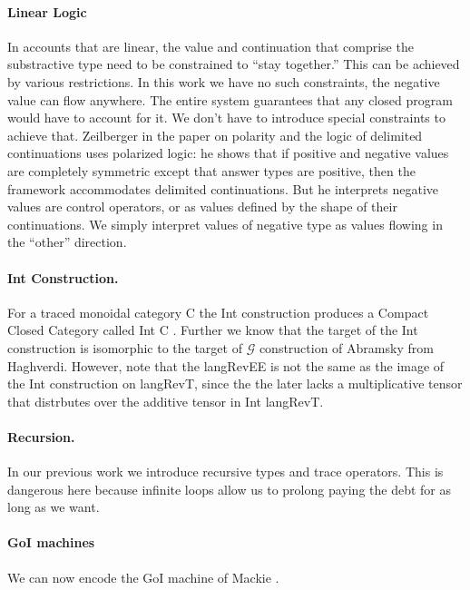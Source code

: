 \documentclass[preprint]{sigplanconf}
\newcommand{\G}{\ensuremath{\mathcal{G}}\xspace}
\begin{document}
\paragraph*{Linear Logic} In accounts that are linear, the value and
continuation that comprise the substractive type need to be constrained to
``stay together.'' This can be achieved by various restrictions. In this work
we have no such constraints, the negative value can flow anywhere. The entire
system guarantees that any closed program would have to account for it. We
don't have to introduce special constraints to achieve that. Zeilberger in
the paper on polarity and the logic of delimited continuations uses polarized
logic: he shows that if positive and negative values are completely symmetric
except that answer types are positive, then the framework accommodates
delimited continuations. But he interprets negative values are control
operators, or as values defined by the shape of their continuations. We
simply interpret values of negative type as values flowing in the ``other''
direction.

\paragraph*{Int Construction.}
For a traced monoidal category {{C}} the Int construction produces a
Compact Closed Category called Int {{C}} \cite{joyal1996traced}.
Further we know that the target of the Int construction is isomorphic
to the target of \G construction of Abramsky \cite{Abramsky96:0} from
Haghverdi. However, note that the {{langRevEE}} is not the same as the
image of the Int construction on {{langRevT}}, since the the later
lacks a multiplicative tensor that distrbutes over the additive tensor
in Int {{langRevT}}.

\paragraph*{Recursion.} In our previous work we introduce recursive types and
trace operators. This is dangerous here because infinite loops allow us to
prolong paying the debt for as long as we want.

\paragraph*{GoI machines} 
We can now encode the GoI machine of Mackie \cite{Mackie2011,DBLP:conf/popl/Mackie95}.

\end{document}
